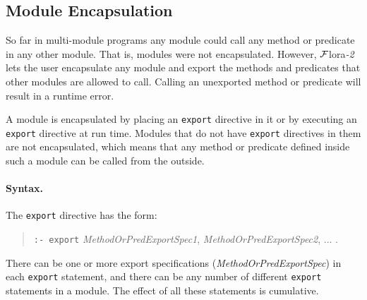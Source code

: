 \documentclass[11pt]{article}
\newcommand{\FLORA}{{\mbox{\sc ${\cal F}${lora}\rm\emph{-2}}}\xspace}
\begin{document}
\subsection{Module Encapsulation}\label{sec-module-encap}

So far in multi-module programs any module could call any method or
predicate in any other module. That is, modules were not encapsulated.
However, \FLORA lets the user encapsulate any module and export the
methods and predicates that other modules are allowed to call. Calling
an unexported method or predicate will result in a runtime error.

A module is encapsulated by placing an {\tt export} directive in it or by
executing an {\tt export} directive at run time.  Modules that do not have
{\tt export} directives in them are not encapsulated, which means that any
method or predicate defined inside such a module can be called from the outside.

\paragraph{Syntax.}
The {\tt export} directive has the form:
\begin{quote}
  {\tt :- export} \emph{MethodOrPredExportSpec1},
  \emph{MethodOrPredExportSpec2}, ... .
\end{quote}
There can be one or more export specifications
(\emph{MethodOrPredExportSpec}) in each {\tt export} statement, and there
can be any number of different {\tt export} statements in a module. The
effect of all 
these statements is cumulative.   
\end{document}
